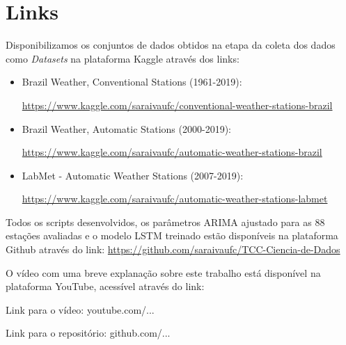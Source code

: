 \chapter{Links}

Disponibilizamos os conjuntos de dados obtidos na etapa da coleta dos dados como \textit{Datasets} na plataforma Kaggle através dos links: 

\begin{itemize}
  \item Brazil Weather, Conventional Stations (1961-2019):
 
  \href{https://www.kaggle.com/saraivaufc/conventional-weather-stations-brazil}{https://www.kaggle.com/saraivaufc/conventional-weather-stations-brazil}
  
  \item Brazil Weather, Automatic Stations (2000-2019):
 
  \href{https://www.kaggle.com/saraivaufc/automatic-weather-stations-brazil}{https://www.kaggle.com/saraivaufc/automatic-weather-stations-brazil}
  
  \item LabMet - Automatic Weather Stations (2007-2019):
 
  \href{https://www.kaggle.com/saraivaufc/automatic-weather-stations-labmet}{https://www.kaggle.com/saraivaufc/automatic-weather-stations-labmet}
\end{itemize}

Todos os scripts desenvolvidos, os parâmetros ARIMA ajustado para as 88 estações avaliadas e o modelo LSTM treinado estão disponíveis na plataforma Github através do link: \href{https://github.com/saraivaufc/TCC-Ciencia-de-Dados}{https://github.com/saraivaufc/TCC-Ciencia-de-Dados}

O vídeo com uma breve explanação sobre este trabalho está disponível na plataforma YouTube, acessível através do link: 
 
Link para o vídeo: youtube.com/... 

Link para o repositório: github.com/... 